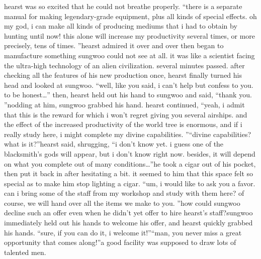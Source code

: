 hearst was so excited that he could not breathe properly.
“there is a separate manual for making legendary-grade equipment, plus all kinds of special effects.
 oh my god, i can make all kinds of producing mediums that i had to obtain by hunting until now! this alone will increase my productivity several times, or more precisely, tens of times.
”hearst admired it over and over then began to manufacture something sungwoo could not see at all.
 it was like a scientist facing the ultra-high technology of an alien civilization.
several minutes passed.
 after checking all the features of his new production once, hearst finally turned his head and looked at sungwoo.
“well, like you said, i can’t help but confess to you.
 to be honest…” then, hearst held out his hand to sungwoo and said, “thank you.
”nodding at him, sungwoo grabbed his hand.
hearst continued, “yeah, i admit that this is the reward for which i won’t regret giving you several airships.
 and the effect of the increased productivity of the world tree is enormous, and if i really study here, i might complete my divine capabilities.
”“divine capabilities? what is it?”hearst said, shrugging, “i don’t know yet.
 i guess one of the blacksmith’s gods will appear, but i don’t know right now.
 besides, it will depend on what you complete out of many conditions…”he took a cigar out of his pocket, then put it back in after hesitating a bit.
it seemed to him that this space felt so special as to make him stop lighting a cigar.
“um, i would like to ask you a favor.
 can i bring some of the staff from my workshop and study with them here? of course, we will hand over all the items we make to you.
”how could sungwoo decline such an offer even when he didn’t yet offer to hire hearst’s staff?sungwoo immediately held out his hands to welcome his offer, and hearst quickly grabbed his hands.
“sure, if you can do it, i welcome it!”“man, you never miss a great opportunity that comes along!”a good facility was supposed to draw lots of talented men.


 